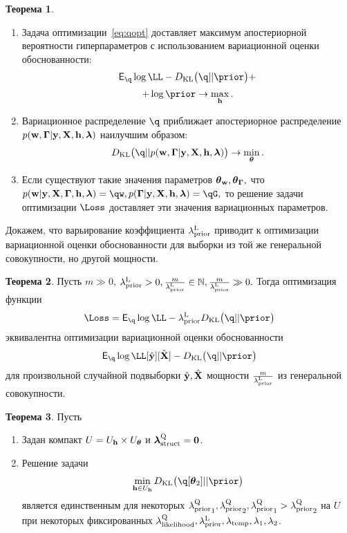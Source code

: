 \documentclass[11pt, a5paper]{dissert}
\theoremstyle{definition}
\newtheorem{theorem}{Теорема}
\begin{document}
{\begin{theorem}
\begin{enumerate}
\item Задача оптимизации~\eqref{eq:qopt} доставляет максимум апостериорной вероятности гиперпараметров с использованием вариационной оценки обоснованности:
\[
    \E_{\q}\log \LL - \KL{\q}{\prior} +
\]
\[
+ \log \prior \to \max_{\h}.
\]
\item Вариационное распределение $\q$ приближает апостериорное распределение $p(\mathbf{w}, \boldsymbol{\Gamma}|\mathbf{y}, \mathbf{X}, \mathbf{h},\boldsymbol{\lambda})$ наилучшим образом:
\[
    \KL{\q}{\post} \to \min_{\teta}.
\]


\item Если существуют такие значения параметров $\boldsymbol{\theta}_\mathbf{w}, \boldsymbol{\theta}_{\boldsymbol{\Gamma}},$ что $\postw = \qw, \postG = \qG,$
то решение задачи оптимизации $\Loss$ доставляет эти значения вариационных параметров.  
\end{enumerate}
\end{theorem}

Докажем, что варьирование коэффициента $\lambda_\text{prior}^\text{L}$ приводит к оптимизации вариационной оценки обоснованности для выборки из той же генеральной совокупности, но другой мощности.

\begin{theorem}
\label{th:elbo_size}
Пусть $m \gg 0$, $\lambda_\text{prior}^\text{L} > 0, \frac{m}{\lambda_\text{prior}^\text{L}}   \in \mathbb{N}, \frac{m}{\lambda_\text{prior}^\text{L}}  \gg 0.$ Тогда оптимизация функции
\[
\Loss = \E_{\q} \log \LL - \lamCL\KL{\q}{\prior}
\]
 эквивалентна оптимизации вариационной оценки обоснованности  $$\E_{\q} \log \LL[\hat{\y}][\hat{\X}] - \KL{\q}{\prior}$$
для произвольной случайной подвыборки $\hat{\mathbf{y}}, \hat{\mathbf{X}}$ мощности $\frac{m}{{\lambda_\text{prior}^\text{L}}}$ из генеральной совокупности.
\end{theorem}


\begin{theorem}
Пусть
\begin{enumerate}
\item Задан компакт $U = U_{\mathbf{h}} \times U_{\boldsymbol{\theta}}$ и  $\boldsymbol{\lambda}_\text{struct}^\text{Q}=\mathbf{0}$. 
\item Решение задачи
\begin{equation}
\label{eq:cp_theorem_kl}
\min_{\h \in \Uh} \KL{\q[\teta_2]}{\prior}
\end{equation}
 является единственным для некоторых ${\lambda_\text{prior}^\text{Q}}_1, {\lambda_\text{prior}^\text{Q}}_2, {\lambda_\text{prior}^\text{Q}}_1 > {\lambda_\text{prior}^\text{Q}}_2$ на $U$ при некоторых фиксированных $\lambda_\text{likelihood}^\text{Q}, \lambda_\text{prior}^\text{L}, \lambda_{\text{temp}}, \lambda_1, \lambda_2$.


\end{enumerate}
\end{theorem}}
\end{document}

